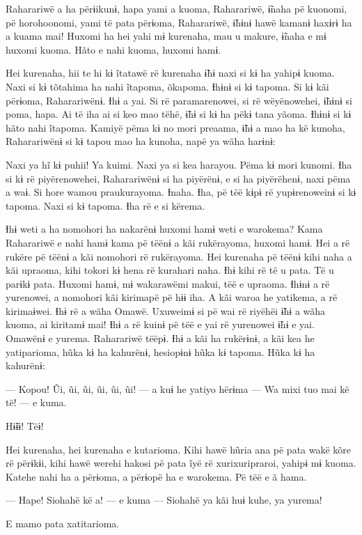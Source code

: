 Raharariwë a ha përɨikunɨ, hapa yami a kuoma, Raharariwë, ɨ̃naha pë
kuonomi, pë horohoonomi, yami të pata përɨoma, Raharariwë, ɨ̃hɨnɨ hawë
kamanɨ haxɨrɨ ha a kuama mai! Huxomi ha hei yahi mɨ kurenaha, mau u
makure, ɨ̃naha e mɨ huxomi kuoma. Hãto e nahi kuoma, huxomi hamɨ. 

Hei kurenaha, hii te hi kɨ ĩtatawë rë kurenaha ɨ̃hɨ naxi si kɨ ha yahipɨ
kuoma. Naxi si kɨ tõtahima ha nahi ĩtapoma, õkapoma. Ɨhɨnɨ si kɨ tapoma.
Si kɨ kãi përɨoma, Raharariwënɨ. Ɨhɨ a yai. Si rë paramarenowei, si rë
wëyënowehei, ɨ̃hɨnɨ si poma, hapa. Ai të iha ai si keo mao tëhë, ɨ̃hɨ si
kɨ ha pëkɨ tana yãoma. Ɨhɨnɨ si kɨ hãto nahi ĩtapoma. Kamiyë pëma kɨ no
mori preaama, ɨ̃hɨ a mao ha kë kunoha, Raharariwënɨ si kɨ tapou mao ha
kunoha, napë ya wãha harɨnɨ: 

Naxi ya hĩ kɨ puhii! Ya kuimi. Naxi ya si kea harayou. Pëma kɨ mori
kunomi. Ɨha si kɨ rë piyërenowehei, Raharariwënɨ si ha piyërënɨ, e si ha
piyërëhenɨ, naxi pëma a waɨ. Si hore wamou praukurayoma. Ɨnaha. Ɨha, pë
tëë kɨpɨ rë yupɨrenoweinɨ si kɨ tapoma. Naxi si kɨ tapoma. Ɨha rë e si
kërema. 

Ɨhɨ weti a ha nomohori ha nakarënɨ huxomi hamɨ weti e warokema? Kama
Raharariwë e nahi hamɨ kama pë tëënɨ a kãi rukërayoma, huxomi hamɨ. Hei
a rë rukëre pë tëënɨ a kãi nomohori rë rukërayoma. Hei kurenaha pë tëënɨ
kihi naha a kãi upraoma, kihi tokori kɨ hena rë kurahari naha. Ɨhɨ kihi
rë të u pata. Të u parɨkɨ pata. Huxomi hamɨ, mɨ wakarawëmi makui, tëë e
upraoma. Ɨhɨnɨ a rë yurenowei, a nomohori kãi kirimapë pë hɨɨ iha. A kãi
waroa he yatikema, a rë kirimaɨwei. Ɨhɨ rë a wãha Omawë. Uxuweimɨ si pë
wai rë riyëhëi ɨ̃hɨ a wãha kuoma, ai kiritamɨ mai! Ɨhɨ a rë kuinɨ pë tëë
e yai rë yurenowei ɨ̃hɨ e yai. Omawënɨ e yurema. Raharariwë tëëpɨ. Ɨhɨ a
kãi ha rukërɨnɨ, a kãi kea he yatiparioma, hũka kɨ ha kahurënɨ,
hesiopɨnɨ hũka kɨ tapoma. Hũka kɨ ha kahurënɨ: 

--- Kopou! Ũi, ũi, ũi, ũi, ũi, ũi! --- a kuɨ he yatiyo hërɨma --- Wa mixi
tuo mai kë të! --- e kuma. 

Hɨ̃ɨɨ! Tëɨ! 

Hei kurenaha, hei kurenaha e kutarioma. Kihi hawë hũria ana pë pata wakë
kõre rë përɨkɨi, kihi hawë werehi hakosi pë pata ĩyë rë xurixuripraroi,
yahipɨ mɨ kuoma. Katehe nahi ha a përɨoma, a përɨopë ha e warokema. Pë
tëë e ã hama. 

--- Hape! Siohahë kë a! --- e kuma --- Siohahë ya kãi huɨ kuhe, ya yurema! 

E mamo pata xatitarioma. 

